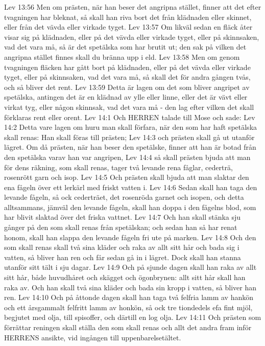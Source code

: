 Lev 13:56  Men om prästen, när han beser det angripna stället, finner att det efter tvagningen har bleknat, så skall han riva bort det från klädnaden eller skinnet, eller från det vävda eller virkade tyget.
Lev 13:57  Om likväl sedan en fläck åter visar sig på klädnaden, eller på det vävda eller virkade tyget, eller på skinnsaken, vad det vara må, så är det spetälska som har brutit ut; den sak på vilken det angripna stället finnes skall du bränna upp i eld.
Lev 13:58  Men om genom tvagningen fläcken har gått bort på klädnaden, eller på det vävda eller virkade tyget, eller på skinnsaken, vad det vara må, så skall det för andra gången tvås, och så bliver det rent.
Lev 13:59  Detta är lagen om det som bliver angripet av spetälska, antingen det är en klädnad av ylle eller linne, eller det är vävt eller virkat tyg, eller någon skinnsak, vad det vara må - den lag efter vilken det skall förklaras rent eller orent.
Lev 14:1  Och HERREN talade till Mose och sade:
Lev 14:2  Detta vare lagen om huru man skall förfara, när den som har haft spetälska skall renas: Han skall föras till prästen;
Lev 14:3  och prästen skall gå ut utanför lägret. Om då prästen, när han beser den spetälske, finner att han är botad från den spetälska varav han var angripen,
Lev 14:4  så skall prästen bjuda att man för dens räkning, som skall renas, tager två levande rena fåglar, cederträ, rosenrött garn och isop.
Lev 14:5  Och prästen skall bjuda att man slaktar den ena fågeln över ett lerkärl med friskt vatten i.
Lev 14:6  Sedan skall han taga den levande fågeln, så ock cederträet, det rosenröda garnet och isopen, och detta alltsammans, jämväl den levande fågeln, skall han doppa i den fågelns blod, som har blivit slaktad över det friska vattnet.
Lev 14:7  Och han skall stänka sju gånger på den som skall renas från spetälskan; och sedan han så har renat honom, skall han slappa den levande fågeln fri ute på marken.
Lev 14:8  Och den som skall renas skall två sina kläder och raka av allt sitt hår och bada sig i vatten, så bliver han ren och får sedan gå in i lägret. Dock skall han stanna utanför sitt tält i sju dagar.
Lev 14:9  Och på sjunde dagen skall han raka av allt sitt hår, både huvudhåret och skägget och ögonbrynen: allt sitt hår skall han raka av. Och han skall två sina kläder och bada sin kropp i vatten, så bliver han ren.
Lev 14:10  Och på åttonde dagen skall han taga två felfria lamm av hankön och ett årsgammalt felfritt lamm av honkön, så ock tre tiondedels efa fint mjöl, begjutet med olja, till spisoffer, och därtill en log olja.
Lev 14:11  Och prästen som förrättar reningen skall ställa den som skall renas och allt det andra fram inför HERRENS ansikte, vid ingången till uppenbarelsetältet.
